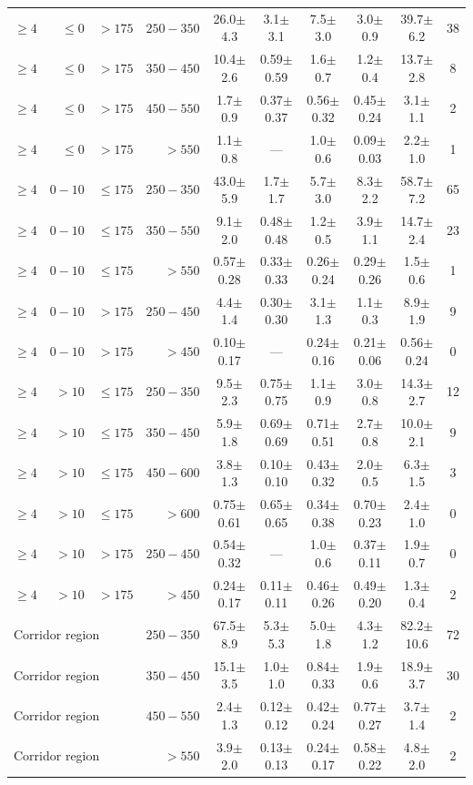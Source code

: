\begin{table}[htbp]
{\begin{tabular}{|r|r|r|r|c|c|c|c|c|c|}
\hline
$\geq4$ & $\leq0$ &     $>175$ & $250-350$ & 26.0$\pm$4.3 & 3.1$\pm$3.1 & 7.5$\pm$3.0 & 3.0$\pm$0.9 & 39.7$\pm$6.2 & 38 \\
$\geq4$ & $\leq0$ &     $>175$ & $350-450$ & 10.4$\pm$2.6 & 0.59$\pm$0.59 & 1.6$\pm$0.7 & 1.2$\pm$0.4 & 13.7$\pm$2.8 & 8 \\
$\geq4$ & $\leq0$ &     $>175$ & $450-550$ & 1.7$\pm$0.9 & 0.37$\pm$0.37 & 0.56$\pm$0.32 & 0.45$\pm$0.24 & 3.1$\pm$1.1 & 2 \\
$\geq4$ & $\leq0$ &     $>175$ &    $>550$ & 1.1$\pm$0.8 & --- & 1.0$\pm$0.6 & 0.09$\pm$0.03 & 2.2$\pm$1.0 & 1 \\
\hline
$\geq4$ &   $0-10$ & $\leq175$ & $250-350$ & 43.0$\pm$5.9 & 1.7$\pm$1.7 & 5.7$\pm$3.0 & 8.3$\pm$2.2 & 58.7$\pm$7.2 & 65 \\
$\geq4$ &   $0-10$ & $\leq175$ & $350-550$ & 9.1$\pm$2.0 & 0.48$\pm$0.48 & 1.2$\pm$0.5 & 3.9$\pm$1.1 & 14.7$\pm$2.4 & 23 \\
$\geq4$ &   $0-10$ & $\leq175$ &    $>550$ & 0.57$\pm$0.28 & 0.33$\pm$0.33 & 0.26$\pm$0.24 & 0.29$\pm$0.26 & 1.5$\pm$0.6 & 1 \\
\hline
$\geq4$ &   $0-10$ &     $>175$ & $250-450$ & 4.4$\pm$1.4 & 0.30$\pm$0.30 & 3.1$\pm$1.3 & 1.1$\pm$0.3 & 8.9$\pm$1.9 & 9 \\
$\geq4$ &   $0-10$ &     $>175$ &    $>450$ & 0.10$\pm$0.17 & --- & 0.24$\pm$0.16 & 0.21$\pm$0.06 & 0.56$\pm$0.24 & 0 \\
\hline
$\geq4$ &    $>10$ & $\leq175$ & $250-350$ & 9.5$\pm$2.3 & 0.75$\pm$0.75 & 1.1$\pm$0.9 & 3.0$\pm$0.8 & 14.3$\pm$2.7 & 12 \\
$\geq4$ &    $>10$ & $\leq175$ & $350-450$ & 5.9$\pm$1.8 & 0.69$\pm$0.69 & 0.71$\pm$0.51 & 2.7$\pm$0.8 & 10.0$\pm$2.1 & 9 \\
$\geq4$ &    $>10$ & $\leq175$ & $450-600$ & 3.8$\pm$1.3 & 0.10$\pm$0.10 & 0.43$\pm$0.32 & 2.0$\pm$0.5 & 6.3$\pm$1.5 & 3 \\
$\geq4$ &    $>10$ & $\leq175$ &    $>600$ & 0.75$\pm$0.61 & 0.65$\pm$0.65 & 0.34$\pm$0.38 & 0.70$\pm$0.23 & 2.4$\pm$1.0 & 0 \\
\hline
$\geq4$ &    $>10$ &     $>175$ & $250-450$ & 0.54$\pm$0.32 & --- & 1.0$\pm$0.6 & 0.37$\pm$0.11 & 1.9$\pm$0.7 & 0 \\
$\geq4$ &    $>10$ &     $>175$ &    $>450$ & 0.24$\pm$0.17 & 0.11$\pm$0.11 & 0.46$\pm$0.26 & 0.49$\pm$0.20 & 1.3$\pm$0.4 & 2 \\
\hline
\multicolumn{3}{|l|}{Corridor region} & $250-350$ & 67.5$\pm$8.9 & 5.3$\pm$5.3 & 5.0$\pm$1.8 & 4.3$\pm$1.2 & 82.2$\pm$10.6 & 72 \\
\multicolumn{3}{|l|}{Corridor region} & $350-450$ & 15.1$\pm$3.5 & 1.0$\pm$1.0 & 0.84$\pm$0.33 & 1.9$\pm$0.6 & 18.9$\pm$3.7 & 30 \\
\multicolumn{3}{|l|}{Corridor region} & $450-550$ & 2.4$\pm$1.3 & 0.12$\pm$0.12 & 0.42$\pm$0.24 & 0.77$\pm$0.27 & 3.7$\pm$1.4 & 2 \\
\multicolumn{3}{|l|}{Corridor region} &    $>550$ & 3.9$\pm$2.0 & 0.13$\pm$0.13 & 0.24$\pm$0.17 & 0.58$\pm$0.22 & 4.8$\pm$2.0 & 2 \\
\hline
\end{tabular}}
\end{table}

